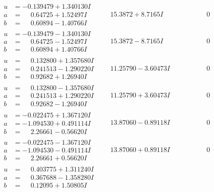 \documentclass[1p]{elsarticle_modified}
\theoremstyle{definition}
\begin{document}
$$\begin{array}{c|c|c}
\begin{aligned}
u &= -0.139479 + 1.340130 I \\
a &= \phantom{-}0.64725 + 1.52497 I \\
b &= \phantom{-}0.60894 - 1.40766 I\end{aligned}
 & \phantom{-}15.3872 + 8.7165 I & \phantom{-0.000000 } 0 \\ \hline\begin{aligned}
u &= -0.139479 - 1.340130 I \\
a &= \phantom{-}0.64725 - 1.52497 I \\
b &= \phantom{-}0.60894 + 1.40766 I\end{aligned}
 & \phantom{-}15.3872 - 8.7165 I & \phantom{-0.000000 } 0 \\ \hline\begin{aligned}
u &= \phantom{-}0.132800 + 1.357680 I \\
a &= \phantom{-}0.241513 - 1.290220 I \\
b &= \phantom{-}0.92682 + 1.26940 I\end{aligned}
 & \phantom{-}11.25790 - 3.60473 I & \phantom{-0.000000 } 0 \\ \hline\begin{aligned}
u &= \phantom{-}0.132800 - 1.357680 I \\
a &= \phantom{-}0.241513 + 1.290220 I \\
b &= \phantom{-}0.92682 - 1.26940 I\end{aligned}
 & \phantom{-}11.25790 + 3.60473 I & \phantom{-0.000000 } 0 \\ \hline\begin{aligned}
u &= -0.022475 + 1.367120 I \\
a &= -1.094530 + 0.491114 I \\
b &= \phantom{-}2.26661 - 0.56620 I\end{aligned}
 & \phantom{-}13.87060 - 0.89118 I & \phantom{-0.000000 } 0 \\ \hline\begin{aligned}
u &= -0.022475 - 1.367120 I \\
a &= -1.094530 - 0.491114 I \\
b &= \phantom{-}2.26661 + 0.56620 I\end{aligned}
 & \phantom{-}13.87060 + 0.89118 I & \phantom{-0.000000 } 0 \\ \hline\begin{aligned}
u &= \phantom{-}0.403775 + 1.311240 I \\
a &= \phantom{-}0.367688 - 1.358280 I \\
b &= \phantom{-}0.12095 + 1.50805 I\end{aligned}

\end{array}$$
\end{document}
